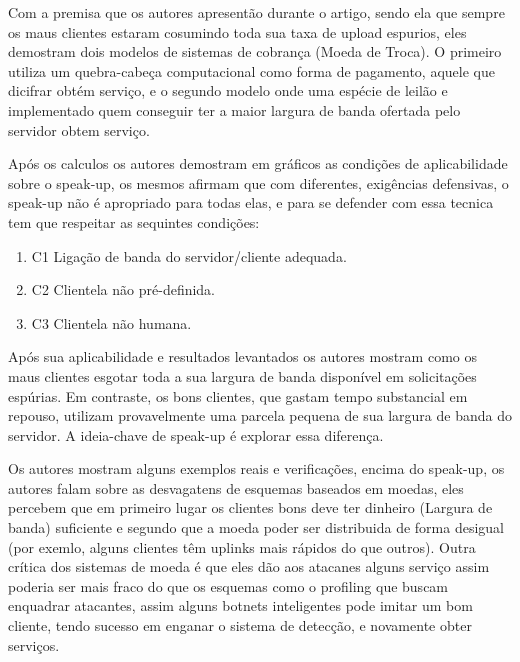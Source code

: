 \documentclass[a4paper,12pt]{article}
\begin{document}
\vspace{0.3cm}


Com a premisa que os autores apresentão durante o artigo, sendo ela que sempre os maus clientes estaram cosumindo toda sua taxa de upload espurios, eles demostram dois modelos de sistemas de cobrança (Moeda de Troca). O primeiro utiliza um quebra-cabeça computacional como forma de pagamento, aquele que dicifrar obtém serviço, e o segundo modelo onde uma espécie de leilão e implementado quem conseguir ter a maior largura de banda ofertada pelo servidor obtem serviço. 

\vspace{0.3cm}


Após os calculos os autores demostram em gráficos as condições de aplicabilidade sobre o speak-up, os mesmos afirmam que com diferentes, exigências defensivas, o speak-up não é apropriado para todas elas, e para se defender com essa tecnica tem que respeitar as sequintes condições: 

\begin{enumerate}
	\item{C1} Ligação de banda do servidor/cliente adequada.

	\item{C2} Clientela não pré-definida.

	\item{C3} Clientela não humana.

\end{enumerate}
 
 \vspace{0.3cm}
 
 Após sua aplicabilidade e resultados levantados os autores mostram como os maus clientes esgotar toda a sua largura de banda disponível em solicitações espúrias. Em contraste, os bons clientes, que gastam tempo substancial em repouso, utilizam provavelmente uma parcela pequena de sua largura de banda do servidor. A ideia-chave de speak-up é explorar essa diferença.
 \vspace{0.3cm}
 
 \vspace{0.3cm}
 
 Os autores mostram alguns exemplos reais e verificações, encima do speak-up, os autores falam sobre as desvagatens de esquemas baseados em moedas, eles percebem que em primeiro lugar os clientes bons deve ter dinheiro (Largura de banda) suficiente e segundo que a moeda poder ser distribuida de forma desigual (por exemlo, alguns clientes têm uplinks mais rápidos do que outros). Outra crítica dos sistemas de moeda é que eles dão aos atacanes alguns serviço assim poderia ser mais fraco do que os esquemas como o profiling que buscam enquadrar atacantes, assim alguns botnets inteligentes pode imitar um bom cliente, tendo sucesso em enganar o sistema de detecção, e novamente obter serviços.
 
\end{document}
